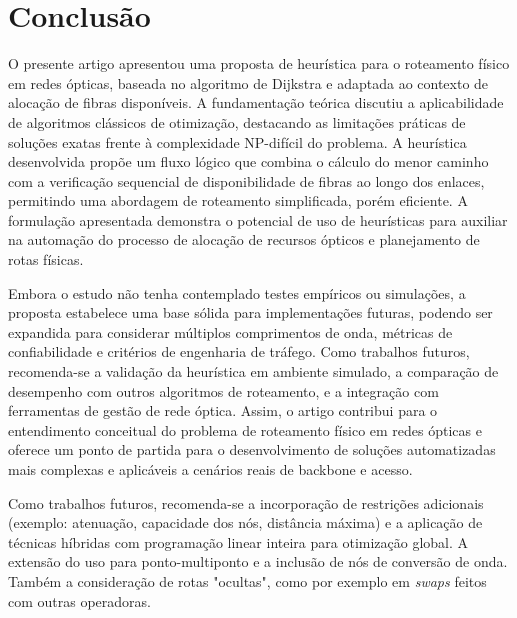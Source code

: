 \section{Conclusão} \label{sec:conclusion}

O presente artigo apresentou uma proposta de heurística para o roteamento
físico em redes ópticas, baseada no algoritmo de Dijkstra e adaptada ao
contexto de alocação de fibras disponíveis. A fundamentação teórica discutiu a
aplicabilidade de algoritmos clássicos de otimização, destacando as limitações
práticas de soluções exatas frente à complexidade NP-difícil do problema. A
heurística desenvolvida propõe um fluxo lógico que combina o cálculo do menor
caminho com a verificação sequencial de disponibilidade de fibras ao longo dos
enlaces, permitindo uma abordagem de roteamento simplificada, porém eficiente.
A formulação apresentada demonstra o potencial de uso de heurísticas para
auxiliar na automação do processo de alocação de recursos ópticos e
planejamento de rotas físicas.

Embora o estudo não tenha contemplado testes empíricos ou simulações, a
proposta estabelece uma base sólida para implementações futuras, podendo ser
expandida para considerar múltiplos comprimentos de onda, métricas de
confiabilidade e critérios de engenharia de tráfego. Como trabalhos futuros,
recomenda-se a validação da heurística em ambiente simulado, a comparação de
desempenho com outros algoritmos de roteamento, e a integração com ferramentas
de gestão de rede óptica. Assim, o artigo contribui para o entendimento
conceitual do problema de roteamento físico em redes ópticas e oferece um ponto
de partida para o desenvolvimento de soluções automatizadas mais complexas e
aplicáveis a cenários reais de backbone e acesso.

Como trabalhos futuros, recomenda-se a incorporação de restrições adicionais
(exemplo: atenuação, capacidade dos nós, distância máxima) e a aplicação de
técnicas híbridas com programação linear inteira para otimização global. A
extensão do uso para ponto-multiponto e a inclusão de nós de conversão de onda.
Também a consideração de rotas "ocultas", como por exemplo em \textit{swaps}
feitos com outras operadoras.



